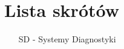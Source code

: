 \chapter*{Lista skrótów}

\begin{itemize}[noitemsep,topsep=0pt,parsep=0pt,partopsep=0pt,labelwidth=1cm,align=left,itemindent=0pt]
\item[SD] - Systemy Diagnostyki
\end{itemize}